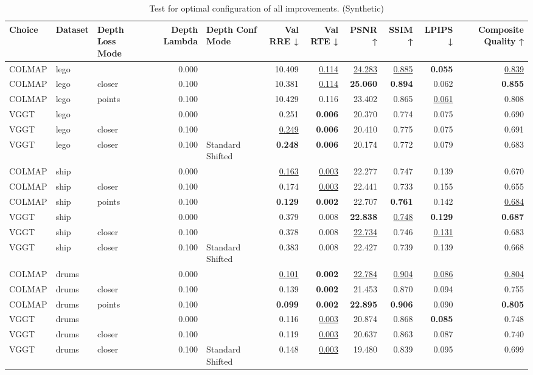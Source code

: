 \begin{table}[H]
\caption{Test for optimal configuration of all improvements. (Synthetic)}
\label{tab:99_all_improvements_synthetic}
\centering
\scriptsize
\begin{tabular}{lllrlrrrrrr}
\toprule
Choice & Dataset & Depth Loss Mode & Depth Lambda & Depth Conf Mode & Val RRE ↓ & Val RTE ↓ & PSNR ↑ & SSIM ↑ & LPIPS ↓ & Composite Quality ↑ \\
\midrule
COLMAP & lego &  & 0.000 &  & 10.409 & \underline{0.114} & \underline{24.283} & \underline{0.885} & \textbf{0.055} & \underline{0.839} \\
COLMAP & lego & closer & 0.100 &  & 10.381 & \underline{0.114} & \textbf{25.060} & \textbf{0.894} & 0.062 & \textbf{0.855} \\
COLMAP & lego & points & 0.100 &  & 10.429 & 0.116 & 23.402 & 0.865 & \underline{0.061} & 0.808 \\
VGGT & lego &  & 0.000 &  & 0.251 & \textbf{0.006} & 20.370 & 0.774 & 0.075 & 0.690 \\
VGGT & lego & closer & 0.100 &  & \underline{0.249} & \textbf{0.006} & 20.410 & 0.775 & 0.075 & 0.691 \\
VGGT & lego & closer & 0.100 & Standard Shifted & \textbf{0.248} & \textbf{0.006} & 20.174 & 0.772 & 0.079 & 0.683 \\
\midrule
COLMAP & ship &  & 0.000 &  & \underline{0.163} & \underline{0.003} & 22.277 & 0.747 & 0.139 & 0.670 \\
COLMAP & ship & closer & 0.100 &  & 0.174 & \underline{0.003} & 22.441 & 0.733 & 0.155 & 0.655 \\
COLMAP & ship & points & 0.100 &  & \textbf{0.129} & \textbf{0.002} & 22.707 & \textbf{0.761} & 0.142 & \underline{0.684} \\
VGGT & ship &  & 0.000 &  & 0.379 & 0.008 & \textbf{22.838} & \underline{0.748} & \textbf{0.129} & \textbf{0.687} \\
VGGT & ship & closer & 0.100 &  & 0.378 & 0.008 & \underline{22.734} & 0.746 & \underline{0.131} & 0.683 \\
VGGT & ship & closer & 0.100 & Standard Shifted & 0.383 & 0.008 & 22.427 & 0.739 & 0.139 & 0.668 \\
\midrule
COLMAP & drums &  & 0.000 &  & \underline{0.101} & \textbf{0.002} & \underline{22.784} & \underline{0.904} & \underline{0.086} & \underline{0.804} \\
COLMAP & drums & closer & 0.100 &  & 0.139 & \textbf{0.002} & 21.453 & 0.870 & 0.094 & 0.755 \\
COLMAP & drums & points & 0.100 &  & \textbf{0.099} & \textbf{0.002} & \textbf{22.895} & \textbf{0.906} & 0.090 & \textbf{0.805} \\
VGGT & drums &  & 0.000 &  & 0.116 & \underline{0.003} & 20.874 & 0.868 & \textbf{0.085} & 0.748 \\
VGGT & drums & closer & 0.100 &  & 0.119 & \underline{0.003} & 20.637 & 0.863 & 0.087 & 0.740 \\
VGGT & drums & closer & 0.100 & Standard Shifted & 0.148 & \underline{0.003} & 19.480 & 0.839 & 0.095 & 0.699 \\
\bottomrule
\end{tabular}
\end{table}
